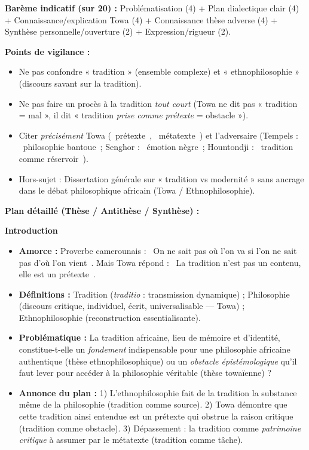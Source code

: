 \documentclass[11pt]{article}
\begin{document}
\begin{corrige}
\textbf{Barème indicatif (sur 20) :} Problématisation (4) + Plan dialectique clair (4) + Connaissance/explication Towa (4) + Connaissance thèse adverse (4) + Synthèse personnelle/ouverture (2) + Expression/rigueur (2).

\textbf{Points de vigilance :}
\begin{itemize}
\item Ne pas confondre « tradition » (ensemble complexe) et « ethnophilosophie » (discours savant sur la tradition).
\item Ne pas faire un procès à la tradition \emph{tout court} (Towa ne dit pas « tradition = mal », il dit « tradition \emph{prise comme prétexte} = obstacle »).
\item Citer \emph{précisément} Towa (\guillemotleft~prétexte~\guillemotright, \guillemotleft~métatexte~\guillemotright) et l'adversaire (Tempels : \guillemotleft~philosophie bantoue~\guillemotright ; Senghor : \guillemotleft~émotion nègre~\guillemotright ; Hountondji : \guillemotleft~tradition comme réservoir~\guillemotright).
\item Hors-sujet : Dissertation générale sur « tradition vs modernité » sans ancrage dans le débat philosophique africain (Towa / Ethnophilosophie).
\end{itemize}

\textbf{Plan détaillé (Thèse / Antithèse / Synthèse) :}

\textbf{Introduction}
\begin{itemize}
\item \textbf{Amorce :} Proverbe camerounais : \guillemotleft~On ne sait pas où l'on va si l'on ne sait pas d'où l'on vient~\guillemotright. Mais Towa répond : \guillemotleft~La tradition n'est pas un contenu, elle est un prétexte~\guillemotright.
\item \textbf{Définitions :} Tradition (\emph{traditio} : transmission dynamique) ; Philosophie (discours critique, individuel, écrit, universalisable — Towa) ; Ethnophilosophie (reconstruction essentialisante).
\item \textbf{Problématique :} La tradition africaine, lieu de mémoire et d'identité, constitue-t-elle un \emph{fondement} indispensable pour une philosophie africaine authentique (thèse ethnophilosophique) ou un \emph{obstacle épistémologique} qu'il faut lever pour accéder à la philosophie véritable (thèse towaïenne) ?
\item \textbf{Annonce du plan :} 1) L'ethnophilosophie fait de la tradition la substance même de la philosophie (tradition comme source). 2) Towa démontre que cette tradition ainsi entendue est un prétexte qui obstrue la raison critique (tradition comme obstacle). 3) Dépassement : la tradition comme \emph{patrimoine critique} à assumer par le métatexte (tradition comme tâche).
\end{itemize}


\end{corrige}
\end{document}

